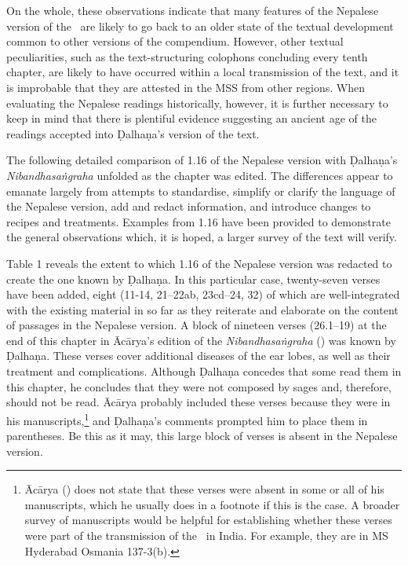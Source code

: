 On the whole, these observations indicate that many features of the Nepalese version of the \SS\ are likely to go back to an older state of the textual development common to other versions of the compendium. 
However, other textual peculiarities, such as the text-structuring colophons concluding every tenth chapter, are likely to have occurred within a local transmission of the text, and it is improbable that they are attested in the MSS from other regions. 
When evaluating the Nepalese readings historically, however, it is further necessary to keep in mind that there is plentiful evidence suggesting an ancient age of the readings accepted into Ḍalhaṇa's version of the text. 


The following detailed comparison of 1.16 of the Nepalese version with Ḍalhaṇa's \emph{Nibandhasaṅgraha} unfolded as the chapter was edited. The differences appear to emanate largely from attempts to standardise, simplify or clarify the language of the Nepalese version, add and redact information, and introduce changes to recipes and treatments. Examples from 1.16 have been provided to demonstrate the general observations which, it is hoped, a larger survey of the text will verify.

Table 1 reveals the extent to which 1.16 of the Nepalese version was redacted to create the one known by Ḍalhaṇa. In this particular case, twenty-seven verses have been added, eight (11-14, 21–22ab, 23cd–24, 32) of which are well-integrated with the existing material in so far as they reiterate and elaborate on the content of passages in the Nepalese version. A block of nineteen verses (26.1–19) at the end of this chapter in Ācārya's edition of the \emph{Nibandhasaṅgraha} (\cite[80]{vulgate}) was known by Ḍalhaṇa. These verses cover additional diseases of the ear lobes, as well as their treatment and complications. Although Ḍalhaṇa concedes that some read them in this chapter, he concludes that they were not composed by sages and, therefore, should not be read. Ācārya probably included these verses because they were in his manuscripts,\footnote{Ācārya (\cite[80]{vulgate}) does not state that these verses were absent in some or all of his manuscripts, which he usually does in a footnote if this is the case. A broader survey of manuscripts would be helpful for establishing whether these verses were part of the transmission of the \SS\ in India. For example, they are in MS Hyderabad Osmania 137-3(b).} and Ḍalhaṇa's comments prompted him to place them in parentheses. Be this as it may, this large block of verses is absent in the Nepalese version. 

